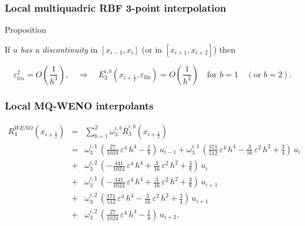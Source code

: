 \documentclass[xcolor=dvipsnames,9pt,mathserif]{beamer}
\newcommand\Rmqbb{\bar{R}^{i,b}}
\newcommand\Emqb{E^{i,b}}
\newcommand\eps{{\varepsilon}}
\newcommand{\coll}[1]{\emph{\color{red} #1}}
\begin{document}
\begin{frame}\frametitle{Local multiquadric RBF 3-point interpolation}
\begin{block}{Proposition}

If $u$ \coll{has a discontinuity} in $[x_{i-1},x_i]$ (or in $[x_{i+1},x_{i+2}]$)
then

$$
{\varepsilon_{lin}^2= O\left(\frac{1}{h^3}\right)},
\quad\Rightarrow\quad
\Emqb_3(x_{i+\frac12},\varepsilon_{\text{lin}})= O\left(\frac{1}{h^2}\right)
\quad { \text{for} }\,\,  b=1  \quad ({\text{or} }\,\, b=2).
$$
\end{block}
     \end{frame}
     \begin{frame}
     \frametitle{Local MQ-WENO interpolants}
     \begin{eqnarray*}
     R^{WENO}_{4}(x_{i+\frac12})& = &\sum_{b=1}^{2}\omega^{i,b}_3 \Rmqbb_{3}(x_{i+\frac12})\\
&=& \omega_3^{i,1} \, \left(\frac{27}{1024}\,{\eps}^4\,h^4-\frac{1}{8}\right) \, u_{i-1}+ \omega_3^{i,1} \, \left(\frac{171}{512}\,{\eps}^4\,h^4-\frac{3}{16}\,{\eps}^2\,h^2+\frac{3}{4}\right)\,u_i\\
&+& \omega_3^{i,2} \, \left(-\frac{441}{1024}\,{\eps}^4\,h^4+\frac{3}{16}\,{\eps}^2\,h^2+\frac{3}{8}\right)  \, u_i\\
&+& \omega_3^{i,1} \, \left(-\frac{441}{1024}\,{\eps}^4\,h^4+\frac{3}{16}\,{\eps}^2\,h^2+\frac{3}{8}\right)\,u_{i+1}\\
&+& \omega_3^{i,2} \, \left(\frac{171}{512}\,{\eps}^4\,h^4-\frac{3}{16}\,{\eps}^2\,h^2+\frac{3}{4}\right) \, u_{i+1}\\
&+&\omega_3^{i,2} \, \left(\frac{27}{1024}\,{\eps}^4\,h^4-\frac{1}{8}\right) \, u_{i+2}.
\end{eqnarray*}
\end{frame}
\end{document}

